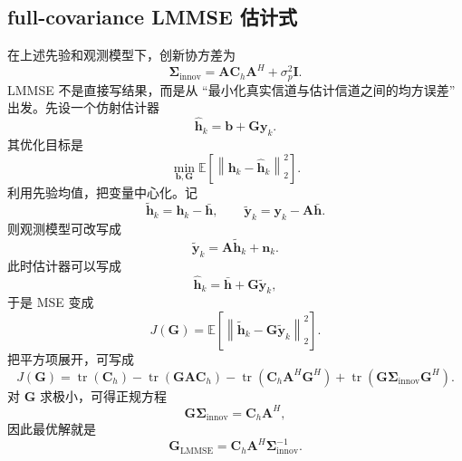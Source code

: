 \documentclass[11pt]{ctexart}
\newcommand{\E}{\mathbb{E}}
\newcommand{\tr}{\operatorname{tr}}
\newcommand{\Id}{\bm{I}}
\begin{document}
\subsection{full-covariance LMMSE 估计式}
在上述先验和观测模型下，创新协方差为
\begin{equation}
    \bm{\Sigma}_{\mathrm{innov}}
    =
    \bm{A}\bm{C}_h\bm{A}^H
    +
    \sigma_p^2 \Id.
\end{equation}
LMMSE 不是直接写结果，而是从 ``最小化真实信道与估计信道之间的均方误差'' 出发。先设一个仿射估计器
\begin{equation}
    \widehat{\bm h}_k
    =
    \bm b + \bm G \bm y_k.
\end{equation}
其优化目标是
\begin{equation}
    \min_{\bm b,\bm G}
    \E\!\left[
        \left\|
            \bm h_k-\widehat{\bm h}_k
        \right\|_2^2
    \right].
\end{equation}
利用先验均值，把变量中心化。记
\begin{equation}
    \widetilde{\bm h}_k
    =
    \bm h_k-\bar{\bm h},
    \qquad
    \widetilde{\bm y}_k
    =
    \bm y_k-\bm A\bar{\bm h}.
\end{equation}
则观测模型可改写成
\begin{equation}
    \widetilde{\bm y}_k
    =
    \bm A \widetilde{\bm h}_k + \bm n_k.
\end{equation}
此时估计器可以写成
\begin{equation}
    \widehat{\bm h}_k
    =
    \bar{\bm h}
    +
    \bm G \widetilde{\bm y}_k,
\end{equation}
于是 MSE 变成
\begin{equation}
    J(\bm G)
    =
    \E\!\left[
        \left\|
            \widetilde{\bm h}_k-\bm G\widetilde{\bm y}_k
        \right\|_2^2
    \right].
\end{equation}
把平方项展开，可写成
\begin{equation}
    J(\bm G)
    =
    \tr(\bm C_h)
    -
    \tr(\bm G\bm A\bm C_h)
    -
    \tr(\bm C_h\bm A^H\bm G^H)
    +
    \tr\!\left(
        \bm G
        \bm{\Sigma}_{\mathrm{innov}}
        \bm G^H
    \right).
\end{equation}
对 $\bm G$ 求极小，可得正规方程
\begin{equation}
    \bm G \bm{\Sigma}_{\mathrm{innov}}
    =
    \bm C_h \bm A^H,
\end{equation}
因此最优解就是
\begin{equation}
    \bm{G}_{\mathrm{LMMSE}}
    =
    \bm{C}_h\bm{A}^H
    \bm{\Sigma}_{\mathrm{innov}}^{-1}.
\end{equation}
\end{document}
